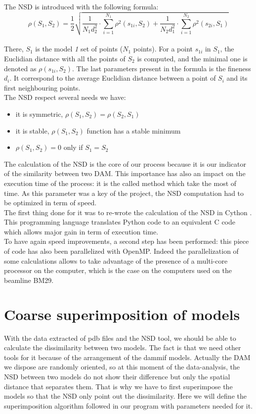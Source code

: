 \documentclass[a4paper, 11pt]{report}
\begin{document}
The NSD is introduced with the following formula:\\
\[
\rho(S_{1},S_{2})= \frac{1}{2} \sqrt {\frac{1}{N_{1}d_{2}^2} 
\cdot \sum\limits_{i=1}^{N_{1}} \rho^2(s_{1i}, S_{2}) + \frac{1}{N_{2}d_{1}^2} \cdot \sum\limits_{i=1}^{N_{2}} \rho^2(s_{2i}, S_{1})}
\]
\\
There, $S_{1}$ is the model \textit{1} set of points ($N_{1}$ points). 
For a point $s_{1i}$ in $S_{1}$, the Euclidian distance with all the 
points of $S_{2}$ is computed, and the minimal one is denoted as 
$\rho(s_{1i}, S_{2})$. 
The last parameters present in the formula is the fineness $d_{i}$. 
It correspond to the average Euclidian distance between a point of 
$S_{i}$ and its first neighbouring points.\\
The NSD respect several needs we have:
\begin{itemize}
 \item it is symmetric, $\rho(S_{1},S_{2}) = \rho(S_{2},S_{1})$
 \item it is stable, $\rho(S_{1},S_{2})$ function has a stable minimum
 \item $\rho(S_{1},S_{2}) = 0$ only if $S_{1} = S_{2}$
\end{itemize}

The calculation of the NSD is the core of our process because it is 
our indicator of the similarity between two DAM. 
This importance has also an impact on the execution time of the 
process: it is the called method which take the most of time. 
As this parameter was a key of the project, the NSD computation had to 
be optimized in term of speed.\\
The first thing done for it was to re-wrote the calculation of the NSD 
in Cython \cite{cython}. 
This programming language translates Python code to an equivalent C 
code which allows major gain in term of execution time.\\
To have again speed improvements, a second step has been performed: 
this piece of code has also been parallelized with OpenMP. 
Indeed the parallelization of some calculations allows to take 
advantage of the presence of a multi-core processor on the computer, 
which is the case on the computers used on the beamline BM29.

\section{Coarse superimposition of models}

With the data extracted of pdb files and the NSD tool, we should be 
able to calculate the dissimilarity between two models. 
The fact is that we need other tools for it because of the arrangement 
of the dammif models. 
Actually the DAM we dispose are randomly oriented, so at this moment 
of the data-analysis, the NSD between two models do not show their 
difference but only the spatial distance that separates them. 
That is why we have to first superimpose the models so that the NSD 
only point out the dissimilarity. 
Here we will define the superimposition algorithm followed in our 
program with parameters needed for it.\\
\end{document}
